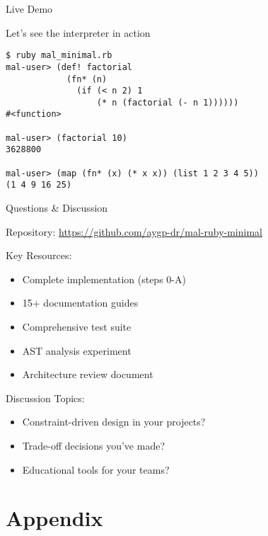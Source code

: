 \documentclass[presentation,aspectratio=169]{beamer}
\begin{document}
\begin{frame}[label={sec:orgca6ccc3},fragile]{Live Demo}
 \begin{center}
Let's see the interpreter in action
\end{center}

\begin{verbatim}
$ ruby mal_minimal.rb
mal-user> (def! factorial 
            (fn* (n) 
              (if (< n 2) 1 
                  (* n (factorial (- n 1))))))
#<function>

mal-user> (factorial 10)
3628800

mal-user> (map (fn* (x) (* x x)) (list 1 2 3 4 5))
(1 4 9 16 25)
\end{verbatim}
\end{frame}
\begin{frame}[label={sec:orga54c1cf}]{Questions \& Discussion}
\begin{center}
\alert{Repository}: \url{https://github.com/aygp-dr/mal-ruby-minimal}

\alert{Key Resources}:
\begin{itemize}
\item Complete implementation (steps 0-A)
\item 15+ documentation guides
\item Comprehensive test suite
\item AST analysis experiment
\item Architecture review document
\end{itemize}
\end{center}

\pause

\begin{center}
\alert{Discussion Topics}:
\begin{itemize}
\item Constraint-driven design in your projects?
\item Trade-off decisions you've made?
\item Educational tools for your teams?
\end{itemize}
\end{center}
\end{frame}
\section{Appendix}
\label{sec:org017f59f}
\end{document}

